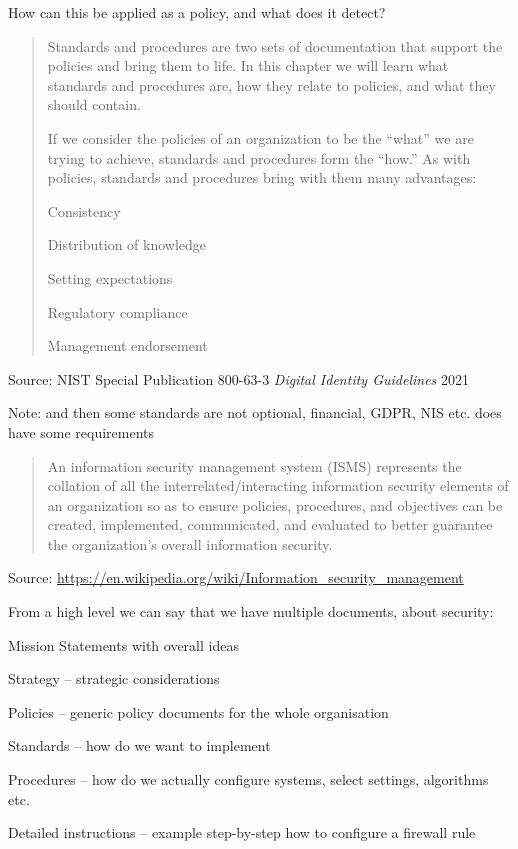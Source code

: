 \documentclass[Screen16to9,17pt]{foils}
\begin{document}
How can this be applied as a policy, and what does it detect?




\begin{quote}
Standards and procedures are two sets of documentation that support the policies and bring them to life. In this chapter we will learn what standards and procedures are, how they relate to policies, and what they should contain.

If we consider the policies of an organization to be the “what” we are trying to achieve, standards and procedures form the “how.” As with policies, standards and procedures bring with them many advantages:
\begin{list2}
\item Consistency
\item Distribution of knowledge
\item Setting expectations
\item Regulatory compliance
\item Management endorsement
\end{list2}
\end{quote}
Source: NIST Special Publication 800-63-3 \emph{Digital Identity Guidelines} 2021

Note: and then some standards are not optional, financial, GDPR, NIS etc. does have some requirements





\begin{quote}\small
An information security management system (ISMS) represents the collation of all the interrelated/interacting information security elements of an organization so as to ensure policies, procedures, and objectives can be created, implemented, communicated, and evaluated to better guarantee the organization's overall information security.
\end{quote}
Source: \url{https://en.wikipedia.org/wiki/Information_security_management}


From a high level we can say that we have multiple documents, about security:
\begin{list2}
\item[] Mission Statements with overall ideas
\item[] Strategy -- strategic considerations
\item[] Policies -- generic policy documents for the whole organisation
\item[] Standards -- how do we want to implement
\item[] Procedures -- how do we actually configure systems, select settings, algorithms etc.
\item[] Detailed instructions -- example step-by-step how to configure a firewall rule
\end{list2}
\end{document}
